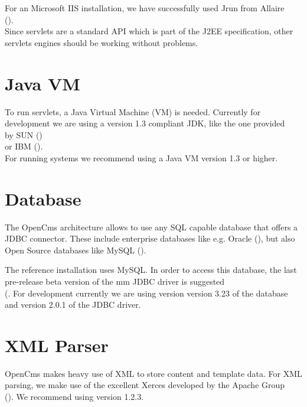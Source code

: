 For an Microsoft IIS installation, we have successfully used Jrun from Allaire \\
().\\
Since servlets are a standard API which is part of the J2EE specification,
other servlets engines should be working without problems.

\section{Java VM}
To run servlets, a Java Virtual Machine (VM) is needed. Currently for development we are using
a version 1.3 compliant JDK, like the one provided \\
by SUN ()\\
or IBM ().\\
For running systems we recommend using a Java VM version 1.3 or
higher.

\section{Database}
The OpenCms architecture allows to use any SQL capable database that offers a JDBC connector.
These include enterprise databases like e.g. Oracle (),
but also Open Source databases like MySQL ().

The reference installation uses MySQL. In order to access this database, the last pre-release
beta version of the mm JDBC driver is suggested\\
(. For
development currently we are using version version 3.23 of the database and version 2.0.1 of the
JDBC driver.

\section{XML Parser}
OpenCms makes heavy use of XML to store content and template data. For XML parsing, we make use of
the excellent Xerces developed by the Apache Group\\
().
We recommend using version 1.2.3.

